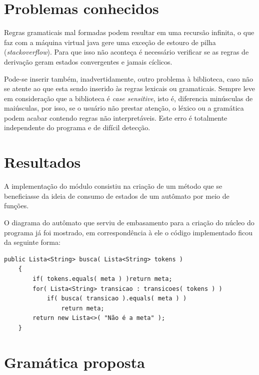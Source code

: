 \documentclass[12pt,a4paper,oneside,english,brazilian,brazil]{abntex2}
\begin{document}
\section{Problemas conhecidos}

\par Regras gramaticais mal formadas podem resultar em uma recursão infinita, o que faz com a máquina virtual java gere uma exceção de estouro de pilha (\textit{stackoverflow}). Para que isso não aconteça é necessário verificar se as regras de derivação geram estados convergentes e jamais cíclicos. \

\par Pode-se inserir também, inadvertidamente, outro problema à biblioteca, caso não se atente ao que esta sendo inserido às regras lexicais ou gramaticais. Sempre leve em consideração que a biblioteca é \textit{case sensitive}, isto é, diferencia minúsculas de maiúsculas, por isso, se o usuário não prestar atenção, o léxico ou a gramática podem acabar contendo regras não interpretáveis. Este erro é totalmente independente do programa e de difícil detecção.

\section{Resultados}


\par A implementação do módulo consistiu na criação de um método que se beneficiasse da ideia de consumo de estados de um autômato por meio de funções. \ 

\par O diagrama do autômato que serviu de embasamento para a criação do núcleo do programa já foi mostrado, em correspondência à ele o código implementado ficou da seguinte forma: \

\setlength{\parindent}{0cm}
\hrulefill
\setlength{\parindent}{1.25cm}
\begin{verbatim}
public Lista<String> busca( Lista<String> tokens )
    {
        if( tokens.equals( meta ) )return meta;
        for( Lista<String> transicao : transicoes( tokens ) )
            if( busca( transicao ).equals( meta ) )
                return meta;
        return new Lista<>( "Não é a meta" );
    }
\end{verbatim}
\setlength{\parindent}{0cm}
\hrulefill
\setlength{\parindent}{1.25cm}

\section{Gramática proposta}
\end{document}
